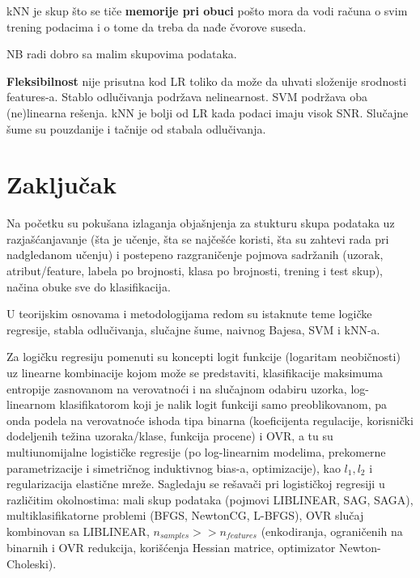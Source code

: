 \documentclass[fontsize=12bp, paper=a4]{scrarticle}
\begin{document}
kNN je skup što se tiče \textbf{memorije pri obuci} pošto mora da vodi računa o svim trening podacima i o tome da treba da nađe čvorove suseda.

NB radi dobro sa malim skupovima podataka.

\textbf{Fleksibilnost} nije prisutna kod LR toliko da može da uhvati složenije srodnosti features-a. Stablo odlučivanja podržava nelinearnost. SVM podržava oba (ne)linearna rešenja.
kNN je bolji od LR kada podaci imaju visok SNR.
Slučajne šume su pouzdanije i tačnije od stabala odlučivanja.

\newpage

\section{Zaključak}

Na početku su pokušana izlaganja objašnjenja za stukturu skupa podataka uz razjašćanjavanje (šta je učenje, šta se najčešće koristi, šta su zahtevi rada pri nadgledanom učenju) i postepeno razgraničenje pojmova sadržanih (uzorak, atribut/feature, labela po brojnosti, klasa po brojnosti, trening i test skup), načina obuke sve do klasifikacija.

\vbox{}

U teorijskim osnovama i metodologijama redom su istaknute teme logičke regresije, stabla odlučivanja, slučajne šume, naivnog Bajesa, SVM i kNN-a. 

\vbox{}


Za logičku regresiju pomenuti su koncepti logit funkcije (logaritam neobičnosti) uz linearne kombinacije kojom može se predstaviti, klasifikacije maksimuma entropije zasnovanom na verovatnoći i na slučajnom odabiru uzorka, log-linearnom klasifikatorom koji je nalik logit funkciji samo preoblikovanom, pa onda podela na verovatnoće ishoda tipa binarna (koeficijenta regulacije, korisnički dodeljenih težina uzoraka/klase, funkcija procene) i OVR, a tu su multiunomijalne logističke regresije (po log-linearnim modelima, prekomerne parametrizacije i simetričnog induktivnog bias-a, optimizacije), kao $l_1, l_2$ i regularizacija elastične mreže. Sagledaju se rešavači pri logističkoj regresiji u različitim okolnostima: mali skup podataka (pojmovi LIBLINEAR, SAG, SAGA), multiklasifikatorne problemi (BFGS, NewtonCG, L-BFGS), OVR slučaj kombinovan sa LIBLINEAR, $n_{samples} >> n_{features}$ (enkodiranja, ograničenih na binarnih i OVR redukcija, korišćenja Hessian matrice, optimizator Newton-Choleski).

\vbox{}
\end{document}
